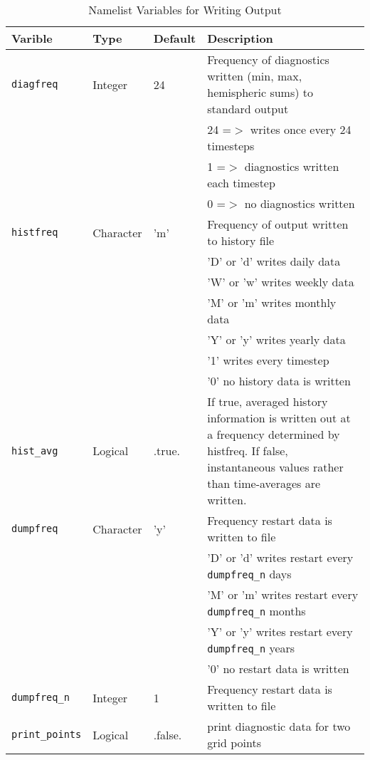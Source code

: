 \begin{table}
  \begin{center}
  \caption{Namelist Variables for Writing Output}
  \label{table:nml_write}
   \begin{tabular}{p{2.0cm}p{2.0cm}p{2.0cm}p{6cm}} \hline
  Varible  & Type & Default  & Description               \\
\hline \hline
{\tt diagfreq} &  Integer &  24 & Frequency of diagnostics written
                     (min, max, hemispheric sums) to standard output   \\
         &          &     & 24  =$>$ writes once every 24 timesteps  \\
         &          &     & 1  =$>$ diagnostics written each timestep \\
         &          &     & 0  =$>$ no diagnostics written \\

{\tt histfreq} & Character & 'm' & Frequency of output written to 
                    history file \\
         &          &     & 'D' or 'd' writes daily data \\
         &          &     & 'W' or 'w' writes weekly data \\
         &          &     & 'M' or 'm' writes monthly data \\
         &          &     & 'Y' or 'y' writes yearly data \\
         &          &     & '1' writes every timestep \\
         &          &     & '0' no history data is written \\

{\tt hist\_avg}  &  Logical & .true. & If true, averaged history
                       information is written out at a frequency
                       determined by histfreq.  If false, instantaneous
                       values rather than time-averages are written. \\

{\tt dumpfreq} & Character & 'y' &  Frequency restart data is written to file \\
         &          &     & 'D' or 'd' writes restart every {\tt dumpfreq\_n} days \\
         &          &     & 'M' or 'm' writes restart every {\tt dumpfreq\_n} months \\
         &          &     & 'Y' or 'y' writes restart every {\tt dumpfreq\_n} years \\
         &          &     & '0' no restart data is written \\

{\tt dumpfreq\_n} & Integer & 1 & Frequency restart data is written to file \\

{\tt \scriptsize{print\_points}} & Logical & .false. & print diagnostic data for two grid points \\
  \hline
  \end{tabular}
  \end{center}
\end{table}

